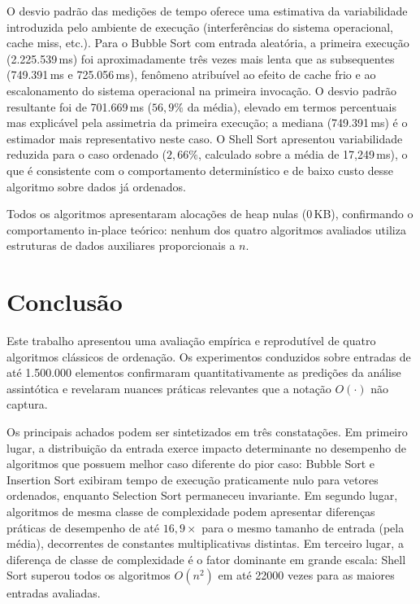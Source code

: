 \documentclass[12pt]{article}
\newcommand{\num}[1]{#1}
\begin{document}
O desvio padrão das medições de tempo oferece uma estimativa
da variabilidade introduzida pelo ambiente de execução
(interferências do sistema operacional, cache miss, etc.).
Para o Bubble Sort com entrada aleatória, a primeira execução
(2.225.539\,ms) foi aproximadamente três vezes mais lenta que
as subsequentes (749.391\,ms e 725.056\,ms), fenômeno
atribuível ao efeito de cache frio e ao escalonamento do
sistema operacional na primeira invocação. O desvio padrão
resultante foi de 701.669\,ms ($56,9\%$ da média), elevado
em termos percentuais mas explicável pela assimetria da
primeira execução; a mediana (749.391\,ms) é o estimador
mais representativo neste caso. O Shell Sort apresentou
variabilidade reduzida para o caso ordenado ($2,66\%$,
calculado sobre a média de 17,249\,ms), o que é consistente
com o comportamento determinístico e de baixo custo
desse algoritmo sobre dados já ordenados.

Todos os algoritmos apresentaram alocações de heap nulas
(0\,KB), confirmando o comportamento in-place
teórico: nenhum dos quatro algoritmos avaliados utiliza
estruturas de dados auxiliares proporcionais a $n$.

\section{Conclusão}
\label{sec:conclusion}

Este trabalho apresentou uma avaliação empírica e reprodutível
de quatro algoritmos clássicos de ordenação. Os experimentos
conduzidos sobre entradas de até 1.500.000 elementos confirmaram
quantitativamente as predições da análise assintótica e
revelaram nuances práticas relevantes que a notação $O(\cdot)$
não captura.

Os principais achados podem ser sintetizados em três constatações.
Em primeiro lugar, a distribuição da entrada exerce impacto
determinante no desempenho de algoritmos que possuem melhor
caso diferente do pior caso: Bubble Sort e Insertion Sort
exibiram tempo de execução praticamente nulo para vetores
ordenados, enquanto Selection Sort permaneceu invariante.
Em segundo lugar, algoritmos de mesma classe de complexidade
podem apresentar diferenças práticas de desempenho de até
$16{,}9\times$ para o mesmo tamanho de entrada (pela média),
decorrentes de constantes multiplicativas distintas.
Em terceiro lugar, a diferença de classe de complexidade é
o fator dominante em grande escala: Shell Sort superou todos
os algoritmos $O(n^2)$ em até \num{22000} vezes para as
maiores entradas avaliadas.
\end{document}
